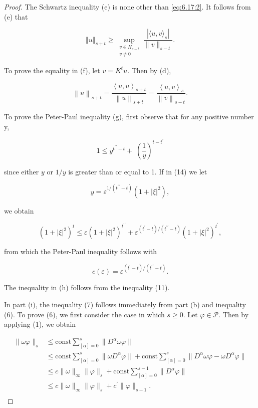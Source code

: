\begin{proof}
The Schwartz inequality (e) is none other than \eqref{eq:6.17:2}. It follows from (e) that

\[
\left\Vert{u}\right\Vert_{s+t}\geq\sup_{\substack{v\in H_{s-t}\\ v\neq0}}\frac{|\langle u,v\rangle_{s}|}{\|v\|_{s-t}}.
\]

To prove the equality in (f), let  $ v = K^{t} u $. Then by (d),

\[
\left\|u\right\|_{s+t}=\frac{\left\langle u,u\right\rangle_{s+t}}{\left\|u\right\|_{s+t}}=\frac{\left\langle u,v\right\rangle_{s}}{\left\|v\right\|_{s-t}}.
\]

To prove the Peter-Paul inequality (g), first observe that for any positive number y,

\begin{equation}
\tag{14}\label{eq:6.18:14}
1\leq y^{t^{\prime\prime}-t}+\;\left(\frac{1}{y}\right)^{t-t^{\prime}}
\end{equation}

since either $y$ or $1/y$ is greater than or equal to 1. If in (14) we let

\[
y=\varepsilon^{1/(t^{\prime\prime}-t)}(1+|\xi|^{2}),
\]

we obtain

\[
(1+|\xi|^{2})^{t}\leq\varepsilon(1+|\xi|^{2})^{t^{\prime\prime}}+\varepsilon^{(t^{\prime}-t)/(t^{\prime\prime}-t)}(1+|\xi|^{2})^{t^{\prime}},
\]

from which the Peter-Paul inequality follows with

\[
c(\varepsilon)=\varepsilon^{(t^{\prime}-t)/(t^{\prime \prime}-t)}.
\]

The inequality in (h) follows from the inequality (11).

In part (i), the inequality (7) follows immediately from part (b) and inequality (6). To prove (6), we first consider the case in which $s \geq 0$. Let $\varphi \in \mathcal{P}$. Then by applying (1), we obtain

\[
\begin{aligned}{\|\omega\varphi\|_{s}}&{{}\leq\mathrm{const}\sum_{[\alpha]=0}^{s}\|D^{\alpha}\omega\varphi\|}\\ {}&{{}\leq\mathrm{const}\sum_{[\alpha]=0}^{s}\|\omega D^{\alpha}\varphi\|+\mathrm{const}\sum_{[\alpha]=0}^{s}\|D^{\alpha}\omega\varphi-\omega D^{\alpha}\varphi\|}\\ {}&{{}\leq c\|\omega\|_{\infty}\|\varphi\|_{s}+\mathrm{const}\sum_{[\alpha]=0}^{s-1}\|D^{\alpha}\varphi\|}\\ {}&{{}\leq c\|\omega\|_{\infty}\|\varphi\|_{s}+c^{\prime}\|\varphi\|_{s-1}.}\\ \end{aligned}
\]


\end{proof}
